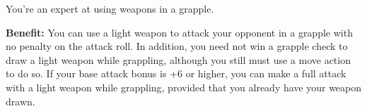 
You’re an expert at using weapons in a grapple.

\textbf{Benefit:} You can use a light weapon to attack your opponent in a grapple with no penalty on the attack roll. In addition, you need not win a grapple check to draw a light weapon while grappling, although you still must use a move action to do so. If your base attack bonus is +6 or higher, you can make a full attack with a light weapon while grappling, provided that you already have your weapon drawn.
